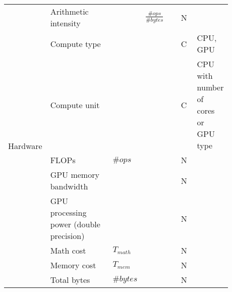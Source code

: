 \begin{tabular}{lp{0.35\linewidth}p{0.10\linewidth}>{\footnotesize}p{0.2\linewidth}p{0.08\linewidth}p{0.15\linewidth}}
  \multirow[t]{9}{*}{Hardware}           & Arithmetic intensity                    &                                   & $\frac{\#ops}{\#bytes}$                 & N    &                                      \\
                                         & Compute type                            &                                   &                                         & C    & CPU, GPU                             \\
                                         & Compute unit                            &                                   &                                         & C    & CPU with number of cores or GPU type \\
                                         & FLOPs                                   & $\#ops$                           &                                         & N    &                                      \\
                                         & GPU memory bandwidth                    &                                   &                                         & N    &                                      \\
                                         & GPU processing power (double precision) &                                   &                                         & N    &                                      \\
                                         & Math cost                               & $T_{math}$                        &                                         & N    &                                      \\
                                         & Memory cost                             & $T_{mem}$                         &                                         & N    &                                      \\
                                         & Total bytes                             & $\#bytes$                         &                                         & N    &                                      \\


\end{tabular}
